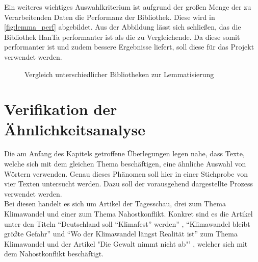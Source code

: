Ein weiteres wichtiges Auswahlkriterium ist aufgrund der großen Menge der zu Verarbeitenden Daten die Performanz der Bibliothek. Diese wird in \ref{fig:lemma_perf} abgebildet. Aus der Abbildung lässt sich schließen, das die Bibliothek HanTa performanter ist als die zu Vergleichende. Da diese somit performanter ist und zudem bessere Ergebnisse liefert, soll diese für das Projekt verwendet werden.
\begin{figure}
	\centering
	
	\caption{Vergleich unterschiedlicher Bibliotheken zur Lemmatisierung}

\end{figure}
\section{Verifikation der Ähnlichkeitsanalyse}
Die am Anfang des Kapitels getroffene Überlegungen legen nahe, dass Texte, welche sich mit dem gleichen Thema beschäftigen, eine ähnliche Auswahl von Wörtern verwenden. Genau dieses Phänomen soll hier in einer Stichprobe von vier Texten untersucht werden. Dazu soll der vorausgehend dargestellte Prozess verwendet werden.  \\ \newline
Bei diesen handelt es sich um Artikel der Tagesschau, drei zum Thema Klimawandel und einer zum Thema Nahostkonflikt. Konkret sind es die Artikel unter den Titeln "`Deutschland soll "`Klimafest"' werden"' \cite[]{tag_klima_klimafest}, "`Klimawandel bleibt größte Gefahr"' \cite[]{tag_klima_gefahr} und "`Wo der Klimawandel längst Realität ist"' \cite[]{tag_klima_realiteat} zum Thema Klimawandel und der Artikel "Die Gewalt nimmt nicht ab"' \cite[]{tag_nahost}, welcher sich mit dem Nahostkonflikt beschäftigt.
